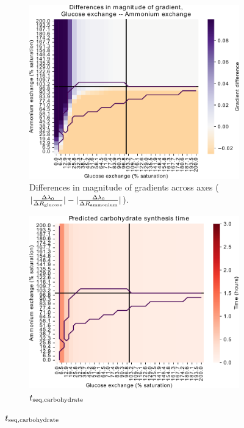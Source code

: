 \begin{figure}
  \begin{subfigure}[t]{0.45\textwidth}
  \centering
    \includegraphics[width=\linewidth]{ec_grid_glc_amm_gradient_compare}
    \caption{
      Differences in magnitude of gradients across axes ($|\frac{\Delta \lambda_{0}}{\Delta R_{\mathrm{glucose}}}| - |\frac{\Delta \lambda_{0}}{\Delta R_{\mathrm{ammonium}}}|$).
    }
    \label{fig:model-grid-glc-gradient-compare}
  \end{subfigure}%
  \begin{subfigure}[t]{0.45\textwidth}
  \centering
    \includegraphics[width=\linewidth]{ec_grid_glc_amm_carb}
    \caption{
      $t_{\mathrm{seq},\mathrm{carbohydrate}}$
    }
    \label{fig:model-grid-glc-carb}
  \end{subfigure}


\end{figure}

